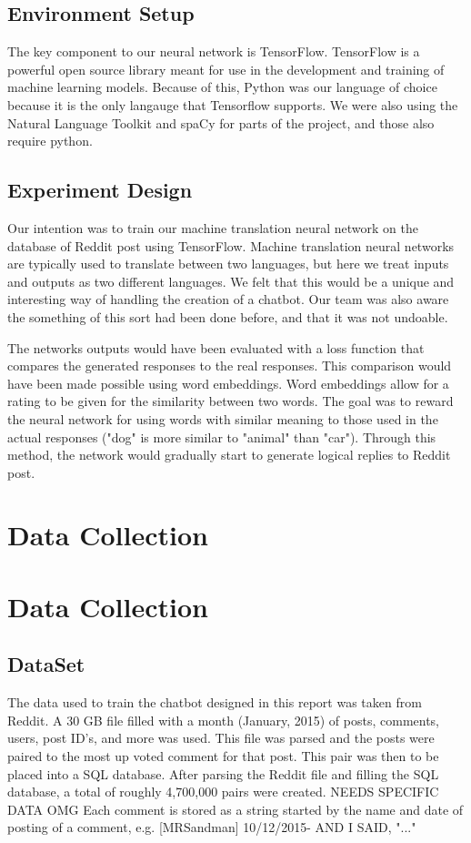 \documentclass[11pt,twocolumn]{article}
\begin{document}
\subsection*{Environment Setup}
The key component to our neural network is TensorFlow.  TensorFlow is a powerful open source library meant for use in the development and training of machine learning models.  Because of this, Python was our language of choice because it is the only langauge that Tensorflow supports.  We were also using the Natural Language Toolkit and spaCy for parts of the project, and those also require python.
\subsection*{Experiment Design}
Our intention was to train our machine translation neural network on the database of Reddit post using TensorFlow.  Machine translation neural networks are typically used to translate between two languages, but here we treat inputs and outputs as two different languages.  We felt that this would be a unique and interesting way of handling the creation of a chatbot.  Our team was also aware the something of this sort had been done before, and that it was not undoable.

The networks outputs would have been evaluated with a loss function that compares the generated responses to the real responses.  This comparison would have been made possible using word embeddings.  Word embeddings allow for a rating to be given for the similarity between two words.  The goal was to reward the neural network for using words with similar meaning to those used in the actual responses ("dog" is more similar to "animal" than "car").  Through this method, the network would gradually start to generate logical replies to Reddit post.

\section{Data Collection}
\section{Data Collection}
\subsection*{DataSet}
The data used to train the chatbot designed in this report was taken from Reddit.  A 30 GB file filled with a month (January, 2015) of posts, comments, users, post ID's, and more was used.  This file was parsed and the posts were paired to the most up voted comment for that post.  This pair was then to be placed into a SQL database.  After parsing the Reddit file and filling the SQL database, a total of roughly 4,700,000 pairs were created. NEEDS SPECIFIC DATA OMG Each comment is stored as a string started by the name and date of posting of a comment, e.g. [MRSandman] 10/12/2015- AND I SAID, "..."
\end{document}
